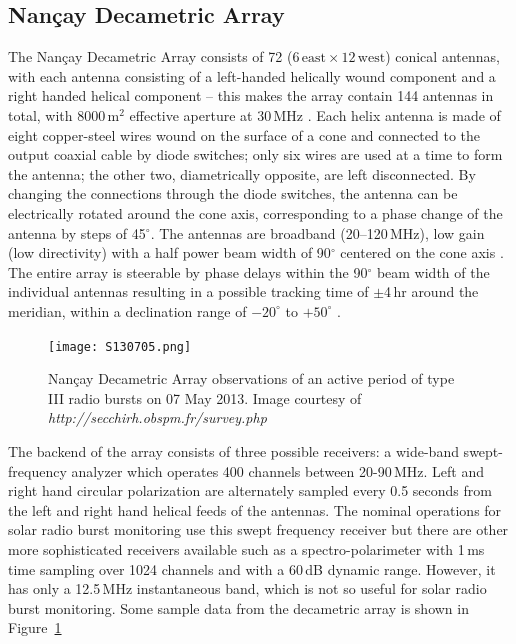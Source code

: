 


\subsection{Nan\c{c}ay Decametric Array}\label{sec:32}

The Nan\c{c}ay Decametric Array consists of 72 ($6\,\mathrm{east} \times12\,\mathrm{west}$) conical antennas, with each antenna consisting of a left-handed helically wound component and a right handed helical component -- this makes the array contain 144 antennas in total, with 8000\,m$^2$ effective aperture at 30\,MHz \citep{lecacheux2000}. Each helix antenna is made of eight copper-steel wires wound on the surface of a cone and connected to the output coaxial cable by diode switches; only six wires are used at a time to form the antenna; the other two, diametrically opposite, are left disconnected. By changing the connections through the diode switches, the antenna can be electrically rotated around the cone axis, corresponding to a phase change of the antenna by steps of 45$^{\circ}$. The antennas are broadband (20--120\,MHz), low gain (low directivity) with a half power beam width of 90$^{\circ}$ centered on the cone axis \citep{boischot1980}. The entire array is steerable by phase delays within the 90$^{\circ}$  beam width of the individual antennas resulting in a possible tracking time of $\pm$4\,hr around the meridian, within a declination range of $-20^{\circ}$ to $+50^{\circ}$ .
\begin{figure}[!t]
\begin{center}
\texttt{[image: S130705.png]}
\caption[Nan\c{c}ay Decametric Array observations]{Nan\c{c}ay Decametric Array observations of an active period of type III radio bursts on 07 May 2013. Image courtesy of {\it http://secchirh.obspm.fr/survey.php}}
\label{fig:nda_typeIIIs}
\end{center}
\end{figure}

The backend of the array consists of three possible receivers: a wide-band swept-frequency analyzer which operates 400 channels between 20-90\,MHz. Left and right hand circular polarization are alternately sampled every 0.5 seconds from the left and right hand helical feeds of the antennas. The nominal operations for solar radio burst monitoring use this swept frequency receiver but there are other more sophisticated receivers available such as a spectro-polarimeter with 1\,ms time sampling over 1024 channels and with a 60\,dB dynamic range. However, it has only a 12.5\,MHz instantaneous band, which is not so useful for solar radio burst monitoring. Some sample data from the decametric array is shown in Figure~\ref{fig:nda_typeIIIs}


